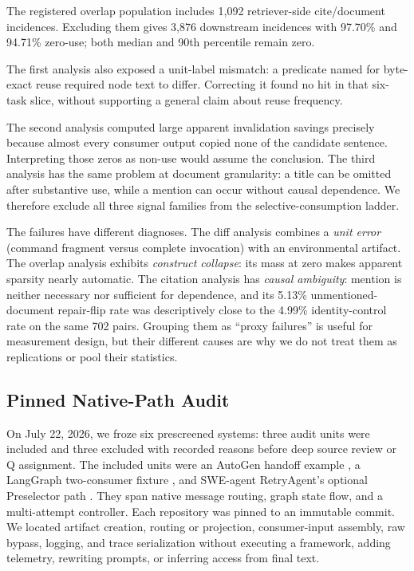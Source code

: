 \documentclass[letterpaper]{article} %
\begin{document}
The registered overlap population includes 1,092 retriever-side cite/document
incidences. Excluding them gives 3,876 downstream incidences with 97.70\% and
94.71\% zero-use; both median and 90th percentile remain zero.

The first analysis also exposed a unit-label mismatch: a predicate named for
byte-exact reuse required node text to differ. Correcting it found no hit in
that six-task slice, without supporting a general claim about reuse frequency.

The second analysis computed large apparent invalidation savings precisely
because almost every consumer output copied none of the candidate sentence.
Interpreting those zeros as non-use would assume the conclusion. The third
analysis has the same problem at document granularity: a title can be omitted
after substantive use, while a mention can occur without causal dependence.
We therefore exclude all three signal families from the selective-consumption
ladder.

The failures have different diagnoses. The diff analysis combines a
\emph{unit error} (command fragment versus complete invocation) with an
environmental artifact. The overlap analysis exhibits \emph{construct
collapse}: its mass at zero makes apparent sparsity nearly automatic. The
citation analysis has \emph{causal ambiguity}: mention is neither necessary
nor sufficient for dependence, and its 5.13\% unmentioned-document repair-flip
rate was descriptively close to the 4.99\% identity-control rate on the same
702 pairs. Grouping them as ``proxy failures'' is useful for measurement design,
but their different causes are why we do not treat them as replications or
pool their statistics.

\subsection{Pinned Native-Path Audit}

On July 22, 2026, we froze six prescreened systems: three audit units were
included and three excluded with recorded reasons before deep source review or
Q assignment. The included units were an AutoGen handoff example
\cite{autogen2024,autogenRepo}, a LangGraph two-consumer fixture
\cite{langgraphRepo}, and SWE-agent RetryAgent's optional Preselector path
\cite{sweagent2024,sweagentRepo}. They span
native message routing, graph state flow, and a multi-attempt controller. Each
repository was pinned to an immutable commit. We located artifact creation,
routing or projection, consumer-input assembly, raw bypass, logging, and trace
serialization without executing a framework, adding telemetry, rewriting
prompts, or inferring access from final text.
\end{document}
